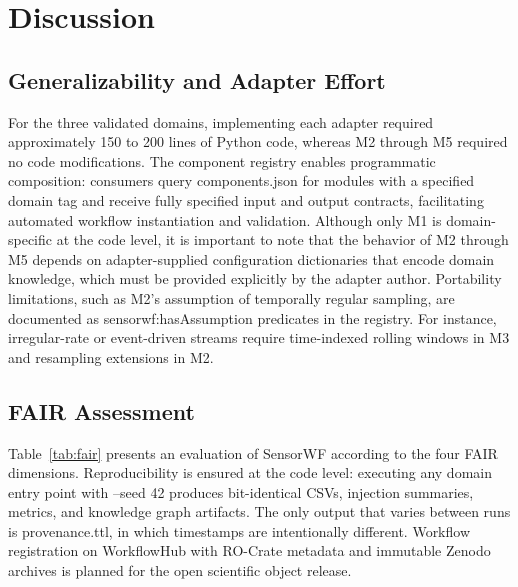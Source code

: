\documentclass[conference]{IEEEtran}
\begin{document}

\section{Discussion}

\subsection{Generalizability and Adapter Effort}

For the three validated domains, implementing each adapter required approximately 150 to 200 lines of Python code, whereas M2 through M5 required no code modifications. The component registry enables programmatic composition: consumers query components.json for modules with a specified domain tag and receive fully specified input and output contracts, facilitating automated workflow instantiation and validation. Although only M1 is domain-specific at the code level, it is important to note that the behavior of M2 through M5 depends on adapter-supplied configuration dictionaries that encode domain knowledge, which must be provided explicitly by the adapter author. Portability limitations, such as M2's assumption of temporally regular sampling, are documented as sensorwf:hasAssumption predicates in the registry. For instance, irregular-rate or event-driven streams require time-indexed rolling windows in M3 and resampling extensions in M2.

\subsection{FAIR Assessment}

Table~\ref{tab:fair} presents an evaluation of SensorWF according to the four FAIR dimensions. Reproducibility is ensured at the code level: executing any domain entry point with --seed 42 produces bit-identical CSVs, injection summaries, metrics, and knowledge graph artifacts. The only output that varies between runs is provenance.ttl, in which timestamps are intentionally different. Workflow registration on WorkflowHub with RO-Crate metadata and immutable Zenodo archives is planned for the open scientific object release.
\end{document}
